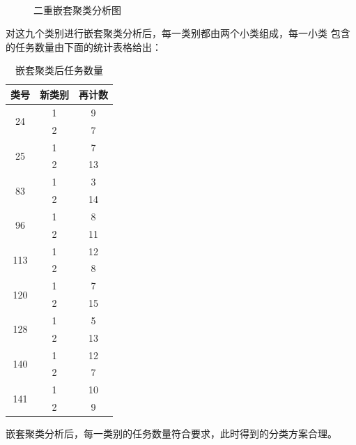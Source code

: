 \begin{figure}
\begin{minipage}[c]{0.3\textwidth}
        \label{fig:sample-figure-c}
    \end{minipage}\\
    \caption{二重嵌套聚类分析图}
    \label{fig:sample-figure}
\end{figure}

对这九个类别进行嵌套聚类分析后，每一类别都由两个小类组成，每一小类
包含的任务数量由下面的统计表格给出：
\begin{longtable}[c]{ccc}
    \caption{嵌套聚类后任务数量}
    \label{tab:my-table}\\
    \hline
    类号                   & 新类别 & 再计数 \\ \hline
    \endfirsthead
    \endhead
    \multirow{2}{*}{24}  & 1   & 9   \\
                         & 2   & 7   \\ \hline
    \multirow{2}{*}{25}  & 1   & 7   \\
                         & 2   & 13  \\ \hline
    \multirow{2}{*}{83}  & 1   & 3   \\
                         & 2   & 14  \\ \hline
    \multirow{2}{*}{96}  & 1   & 8   \\
                         & 2   & 11  \\ \hline
    \multirow{2}{*}{113} & 1   & 12  \\
                         & 2   & 8   \\ \hline
    \multirow{2}{*}{120} & 1   & 7   \\
                         & 2   & 15  \\ \hline
    \multirow{2}{*}{128} & 1   & 5   \\
                         & 2   & 13  \\ \hline
    \multirow{2}{*}{140} & 1   & 12  \\
                         & 2   & 7   \\ \hline
    \multirow{2}{*}{141} & 1   & 10  \\
                         & 2   & 9   \\ \hline
    \end{longtable}
嵌套聚类分析后，每一类别的任务数量符合要求，此时得到的分类方案合理。


